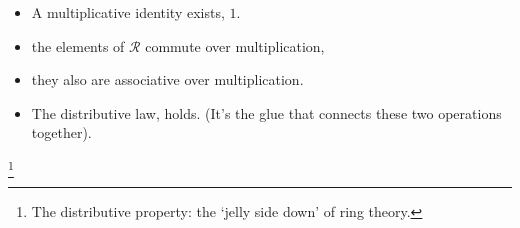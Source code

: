 \begin{itemize}
    \item A multiplicative identity exists, $1$.
    \item the elements of $\mathcal{R}$ commute over multiplication,
    \item they also are associative over multiplication.
    \item The distributive law, holds. (It's the glue that connects these two operations together).             
\end{itemize}
\footnote{The distributive property: the `jelly side down' of ring theory.}





